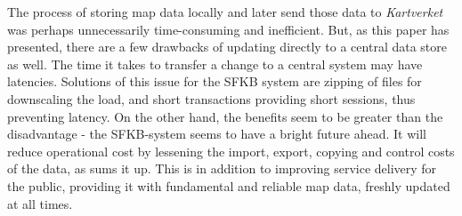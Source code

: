 The process of storing map data locally and later send those data to \textit{Kartverket} was perhaps unnecessarily time-consuming and inefficient. But, as this paper has presented, there are a few drawbacks of updating directly to a central data store as well. The time it takes to transfer a change to a central system may have latencies. Solutions of this issue for the SFKB system are zipping of files for downscaling the load, and short transactions providing short sessions, thus preventing latency.
On the other hand, the benefits seem to be greater than the disadvantage - the SFKB-system seems to have a bright future ahead. It will reduce operational cost by lessening the import, export, copying and control costs of the data, as \cite{Kartverket2017e} sums it up.  This is in addition to improving service delivery for the public, providing it with fundamental and reliable map data, freshly updated at all times. 
